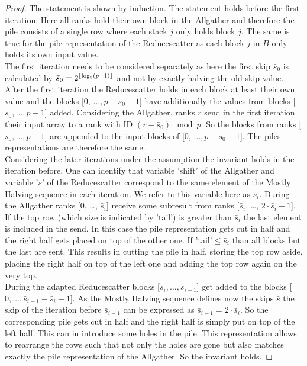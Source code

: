 \begin{proof}
	The statement is shown by induction. The statement holds before the first iteration. Here all ranks hold their own block in the Allgather and therefore the pile consists of a single row where each stack $j$ only holds block $j$. The same is true for the pile representation of the Reducescatter as each block $j$ in $B$ only holds its own input value.\\
    The first iteration needs to be considered separately as here the first skip $\bar{s}_0$ is calculated by $\bar{s}_0=2^{\lfloor\log_2(p-1)\rfloor}$ and not by exactly halving the old skip value. After the first iteration the Reducescatter holds in each block at least their own value and the blocks [0, $\dots, p-\bar{s}_0-1$] have additionally the values from blocks [$\bar{s}_0, \dots, p-1$] added. Considering the Allgather,  ranks $r$ send in the first iteration their input array to a rank with ID $(r-\bar{s}_0) \mod {p}$. So the blocks from ranks [$\bar{s}_0, \dots, p-1$] are appended to the input blocks of [0, $\dots, p-\bar{s}_0-1$]. The piles representations are therefore the same.\\
	Considering the later iterations under the assumption the invariant holds in the iteration before. One can identify that variable 'shift' of the Allgather and variable '$s$' of the Reducescatter correspond to the same element of the Mostly Halving sequence in each iteration. We refer to this variable here as $\bar{s}_i$. During the Allgather ranks [0, \dots, $\bar{s}_i$] receive some  subresult from ranks [$\bar{s}_i$, \dots, $2\cdot\bar{s}_i-1$]. If the top row (which size is indicated by 'tail') is greater than $\bar{s}_i$ the last element is included in the send. In this case the pile representation gets cut in half and the right half gets placed on top of the other one. If 'tail'$\leq \bar{s}_i$ than all blocks but the last are sent. This results in cutting the pile in half, storing the top row aside, placing the right half on top of the left one and adding the top row again on the very top.\\
    During the adapted Reducescatter blocks [$\bar{s}_i, \dots, \bar{s}_{i-1}$] get added to the blocks [$0, \dots, \bar{s}_{i-1}-\bar{s}_i-1$]. As the Mostly Halving sequence defines now the skips $\bar{s}$ the skip of the iteration before $\bar{s}_{i-1}$ can be expressed as $\bar{s}_{i-1}=2\cdot \bar{s}_i$. So the corresponding pile gets cut in half and the right half is simply put on top of the left half. This can in introduce some holes in the pile. This representation allows to rearrange the rows such that not only the holes are gone but also matches exactly the pile representation of the Allgather. So the invariant holds.
    \end{proof}
